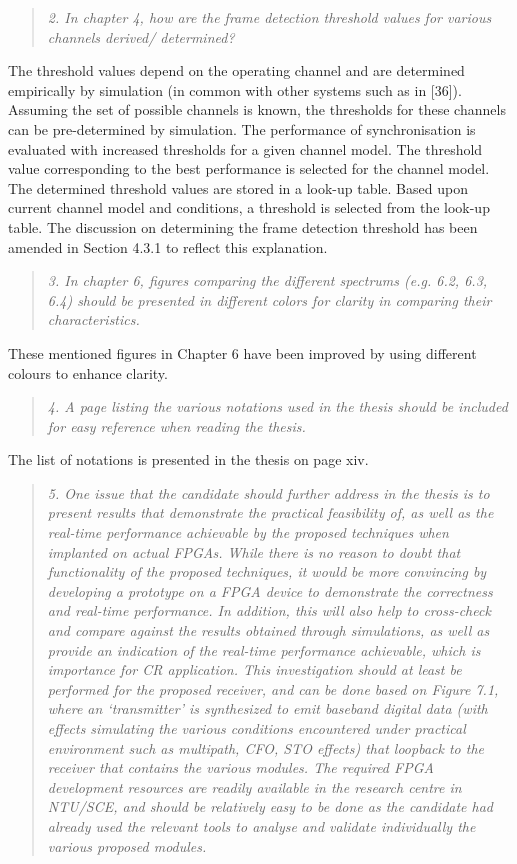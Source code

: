 \documentclass{article}
\begin{document}
\begin{quote}
\emph{2. In chapter 4, how are the frame detection threshold values for various channels derived/ determined?}
\end{quote}
The threshold values depend on the operating channel and are determined empirically by simulation (in common with other systems such as in [36]). Assuming the set of possible channels is known, the thresholds for these channels can be pre-determined by simulation. The performance of synchronisation is evaluated with increased thresholds for a given channel model. The threshold value corresponding to the best performance is selected for the channel model. The determined threshold values are stored in a look-up table. Based upon current channel model and conditions, a threshold is selected from the look-up table.
The discussion on determining the frame detection threshold has been amended in Section 4.3.1 to reflect this explanation.

\begin{quote}
\emph{3. In chapter 6, figures comparing the different spectrums (e.g. 6.2, 6.3, 6.4) should be presented in different colors for clarity in comparing their characteristics.}
\end{quote}
These mentioned figures in Chapter 6 have been improved by using different colours to enhance clarity.

\begin{quote}
\emph{4. A page listing the various notations used in the thesis should be included for easy reference when reading the thesis.}
\end{quote}
The list of notations is presented in the thesis on page xiv.

\begin{quote}
\emph{5. One issue that the candidate should further address in the thesis is to present results that demonstrate the practical feasibility of, as well as the real-time performance achievable by the proposed techniques when implanted on actual FPGAs. While there is no reason to doubt that functionality of the proposed techniques, it would be more convincing by developing a prototype on a FPGA device to demonstrate the correctness and real-time performance. In addition, this will also help to cross-check and compare against the results obtained through simulations, as well as provide an indication of the real-time performance achievable, which is importance for CR application. This investigation should at least be performed for the proposed receiver, and can be done based on Figure 7.1, where an `transmitter' is synthesized to emit baseband digital data (with effects simulating the various conditions encountered under practical environment such as multipath, CFO, STO effects) that loopback to the receiver that contains the various modules. The required FPGA development resources are readily available in the research centre in NTU/SCE, and should be relatively easy to be done as the candidate had already used the relevant tools to analyse and validate individually the various proposed modules.}
\end{quote}
\end{document}
